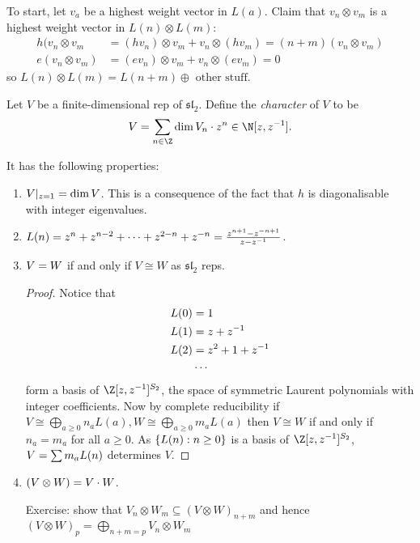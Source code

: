 \documentclass[a4paper]{article}
\newcommand*{\Lie}[1]{\mathfrak{#1}} %
\let\ch\relax
\DeclareMathOperator{\ch}{ch} %
\begin{document}
To start, let \(v_a\) be a highest weight vector in \(L(a)\). Claim that \(v_n \otimes v_m\) is a highest weight vector in \(L(n) \otimes L(m)\):
\begin{align*}
  h(v_n \otimes v_m &= (hv_n) \otimes v_m + v_n \otimes (hv_m) = (n + m) (v_n \otimes v_m) \\
  e(v_n \otimes v_m) &= (ev_n) \otimes v_m + v_n \otimes (ev_m) = 0
\end{align*}
so \(L(n) \otimes L(m) = L(n + m) \oplus \text{ other stuff}\).

\begin{definition}[character]
  Let \(V\) be a finite-dimensional rep of \(\Lie{sl}_2\). Define the \emph{character} of \(V\) to be
  \[
    \ch V = \sum_{n \in \Z} \dim V_n \cdot z^n \in \N[z, z^{-1}].
  \]
\end{definition}

It has the following properties:
\begin{enumerate}
\item \(\ch V|_{z = 1} = \dim V\). This is a consequence of the fact that \(h\) is diagonalisable with integer eigenvalues.
\item \(\ch L(n) = z^n + z^{n - 2} + \dots + z^{2 - n} + z^{-n} = \frac{z^{n + 1} - z^{-{n + 1}}}{z - z^{-1}}\).
\item \(\ch V = \ch W\) if and only if \(V \cong W\) as \(\Lie{sl}_2\) reps.
  \begin{proof}
    Notice that
    \begin{align*}
      \ch L(0) &= 1 \\
      \ch L(1) &= z + z^{-1} \\
      \ch L(2) &= z^2 + 1 + z^{-1} \\
               &\cdots
    \end{align*}
    form a basis of \(\Z[z, z^{-1}]^{S_2}\), the space of symmetric Laurent polynomials with integer coefficients. Now by complete reducibility if \(V \cong \bigoplus _{a\geq 0} n_a L(a), W \cong \bigoplus_{a \geq 0} m_a L(a)\) then \(V \cong W\) if and only if \(n_a = m_a\) for all \(a \geq 0\). As \(\{\ch L(n): n \geq 0\}\) is a basis of \(\Z[z, z^{-1}]^{S_2}\), \(\ch V = \sum m_a \ch L(n)\) determines \(V\).
  \end{proof}
\item \(\ch (V \otimes W) = \ch V \cdot \ch W\).

  Exercise: show that \(V_n \otimes W_m \subseteq (V \otimes W)_{n + m}\) and hence \((V \otimes W)_p = \bigoplus_{n + m = p} V_n \otimes W_m\)
\end{enumerate}








\printindex
\end{document}
